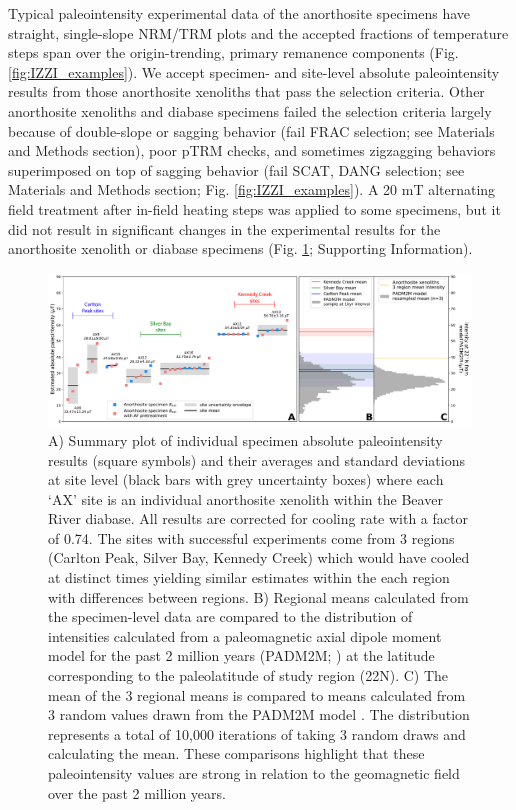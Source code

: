 \documentclass[9pt,twocolumn,twoside,lineno]{pnas-new}
\begin{document}
Typical paleointensity experimental data of the anorthosite specimens have straight, single-slope NRM/TRM plots and the accepted fractions of temperature steps span over the origin-trending, primary remanence components (Fig. \ref{fig:IZZI_examples}). We accept specimen- and site-level absolute paleointensity results from those anorthosite xenoliths that pass the selection criteria. Other anorthosite xenoliths and diabase specimens failed the selection criteria largely because of double-slope or sagging behavior (fail FRAC selection; see Materials and Methods section), poor pTRM checks, and sometimes zigzagging behaviors superimposed on top of sagging behavior (fail SCAT, DANG selection; see Materials and Methods section; Fig. \ref{fig:IZZI_examples}). A 20 mT alternating field treatment after in-field heating steps was applied to some specimens, but it did not result in significant changes in the experimental results for the anorthosite xenolith or diabase specimens (Fig. \ref{fig:PINT_cooling_corrected}; Supporting Information). 

\begin{figure}[h!]
\noindent\includegraphics[width=17.8 cm]{Paleointensity_plot_cooling_corrected.pdf}
\centering
\caption{\footnotesize{A) Summary plot of individual specimen absolute paleointensity results (square symbols) and their averages and standard deviations at site level (black bars with grey uncertainty boxes) where each `AX' site is an individual anorthosite xenolith within the Beaver River diabase. All results are corrected for cooling rate with a factor of 0.74. The sites with successful experiments come from 3 regions (Carlton Peak, Silver Bay, Kennedy Creek) which would have cooled at distinct times yielding similar estimates within the each region with differences between regions. B) Regional means calculated from the specimen-level data are compared to the distribution of intensities calculated from a paleomagnetic axial dipole moment model for the past 2 million years (PADM2M; \citealp{Ziegler2011a}) at the latitude corresponding to the paleolatitude of study region (22\textdegree N). C) The mean of the 3 regional means is compared to means calculated from 3 random values drawn from the PADM2M model \cite{Ziegler2011a}. The distribution represents a total of 10,000 iterations of taking 3 random draws and calculating the mean. These comparisons highlight that these paleointensity values are strong in relation to the geomagnetic field over the past 2 million years.}}
\label{fig:PINT_cooling_corrected}
\end{figure}
\end{document}
